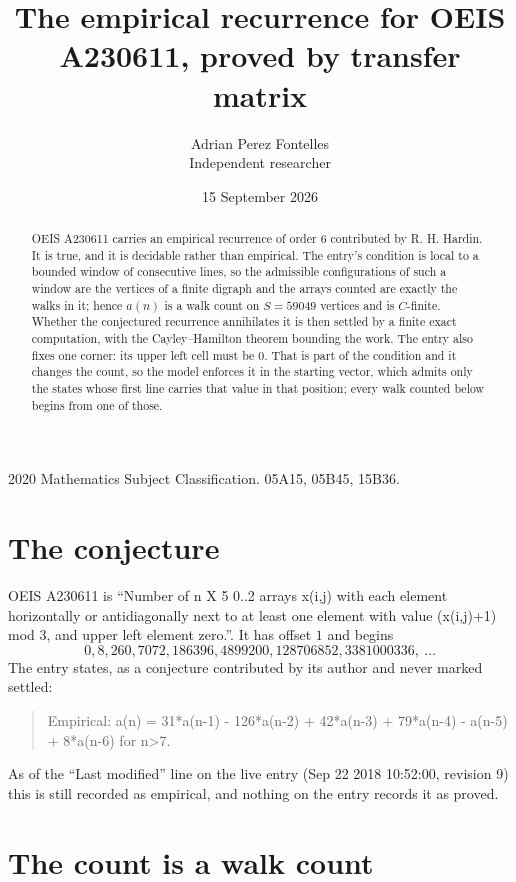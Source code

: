 \documentclass[11pt,a4paper]{article}
\title{The empirical recurrence for OEIS A230611, proved by transfer matrix}
\author{Adrian Perez Fontelles\\ \small Independent researcher}
\date{15 September 2026}
\theoremstyle{plain}
\theoremstyle{definition}
\begin{document}
\maketitle

\begin{abstract}
OEIS A230611 carries an empirical recurrence of order $6$ contributed by R. H. Hardin. It is
true, and it is decidable rather than empirical. The entry's condition is local to a bounded window of consecutive lines, so
the admissible configurations of such a window are the vertices of a finite digraph and the
arrays counted are exactly the walks in it; hence $a(n)$ is a walk count on $S=59049$ vertices
and is $C$-finite. Whether the conjectured recurrence annihilates it is then settled by a
finite exact computation, with the Cayley--Hamilton theorem bounding the work.
 The entry also fixes one corner: its upper left cell must be $0$. That is part of the condition and it changes the count, so the model enforces it in the starting vector, which admits only the states whose first line carries that value in that position; every walk counted below begins from one of those.\end{abstract}

\noindent\small 2020 Mathematics Subject Classification. 05A15, 05B45, 15B36.\normalsize

\section{The conjecture}

OEIS A230611 is ``Number of n X 5 0..2 arrays x(i,j) with each element horizontally or antidiagonally next to at least one element with value (x(i,j)+1) mod 3, and upper left element zero.''. It has offset $1$ and begins
\[
0, 8, 260, 7072, 186396, 4899200, 128706852, 3381000336,\ \dots
\]
The entry states, as a conjecture contributed by its author and never marked settled:
\begin{quote}
Empirical: a(n) = 31*a(n-1) - 126*a(n-2) + 42*a(n-3) + 79*a(n-4) - a(n-5) + 8*a(n-6) for n>7.
\end{quote}
As of the ``Last modified'' line on the live entry (Sep 22 2018 10:52:00, revision 9) this is still
recorded as empirical, and nothing on the entry records it as proved.

\section{The count is a walk count}
\end{document}
